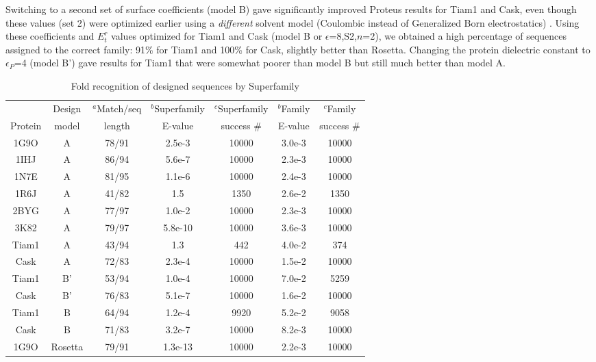 \documentclass[12pt]{article}
\begin{document}
Switching to a second set of surface coefficients (model B) gave significantly improved Proteus results for Tiam1 and Cask,
even though these values (set 2) were optimized earlier using a {\it different} solvent model (Coulombic instead of Generalized
Born electrostatics) \cite{Schmidt08b}. Using these coefficients and $E^r_t$ values optimized for Tiam1 and Cask (model B or
$\epsilon$=8,S2,$n$=2), we obtained a high percentage of sequences assigned to the correct family: 91\% for Tiam1 and 100\%
for Cask, slightly better than Rosetta. Changing the protein dielectric constant to $\epsilon_P$=4 (model B') gave results
for Tiam1 that were somewhat poorer than model B but still much better than model A.
\begin{table}[h]                            
\caption{Fold recognition of designed sequences by Superfamily}
\label{tab:superfamily}                      
\begin{center} 
\begin{tabular}{ccccccc} \hline \hline  
        & Design  & $^a$Match/seq & $^b$Superfamily & $^c$Superfamily & $^b$Family & $^c$Family     \\
Protein & model   & length        & E-value         & success \#     & E-value    & success \# \\ \hline
1G9O    &  A      & 78/91 & 2.5e-3  & 10000 & 3.0e-3 & 10000 \\
1IHJ    &  A      & 86/94 & 5.6e-7  & 10000 & 2.3e-3 & 10000 \\
1N7E    &  A      & 81/95 & 1.1e-6  & 10000 & 2.4e-3 & 10000 \\
1R6J    &  A      & 41/82 & 1.5     &  1350 & 2.6e-2 &  1350 \\
2BYG    &  A      & 77/97 & 1.0e-2  & 10000 & 2.3e-3 & 10000 \\
3K82    &  A      & 79/97 & 5.8e-10 & 10000 & 3.6e-3 & 10000 \\ 
Tiam1   &  A      & 43/94 & 1.3     &   442 & 4.0e-2 &   374 \\
Cask    &  A      & 72/83 & 2.3e-4  & 10000 & 1.5e-2 & 10000 \\ \hline
Tiam1   &  B'     & 53/94 & 1.0e-4  & 10000 & 7.0e-2 &  5259 \\
Cask    &  B'     & 76/83 & 5.1e-7  & 10000 & 1.6e-2 & 10000 \\ \hline
Tiam1   &  B      & 64/94 & 1.2e-4  &  9920 & 5.2e-2 & 9058 \\
Cask    &  B      & 71/83 & 3.2e-7  & 10000 & 8.2e-3 & 10000 \\ \hline
1G9O    & Rosetta & 79/91 & 1.3e-13 & 10000 & 2.2e-3 & 10000 \\

\end{tabular}
\end{center}
\end{table}
\end{document}
